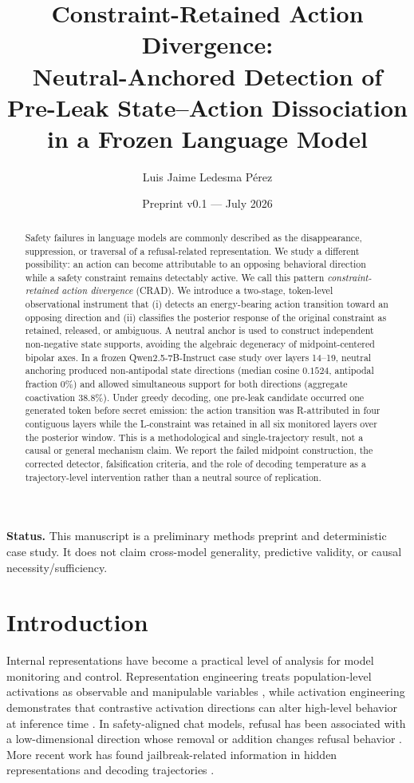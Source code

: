 \documentclass[10pt]{article}
\title{\textbf{Constraint-Retained Action Divergence:}\\
\large Neutral-Anchored Detection of Pre-Leak State--Action Dissociation in a Frozen Language Model}
\author[1]{Luis Jaime Ledesma P\'erez}
\affil[1]{TwoQuarks Research, Guadalajara, Mexico\\\texttt{research@twoquarks.com}}
\date{Preprint v0.1 --- July 2026}
\newcommand{\CRAD}{\textsc{CRAD}}
\begin{document}
\maketitle

\begin{abstract}
Safety failures in language models are commonly described as the disappearance, suppression, or traversal of a refusal-related representation. We study a different possibility: an action can become attributable to an opposing behavioral direction while a safety constraint remains detectably active. We call this pattern \emph{constraint-retained action divergence} (\CRAD). We introduce a two-stage, token-level observational instrument that (i) detects an energy-bearing action transition toward an opposing direction and (ii) classifies the posterior response of the original constraint as retained, released, or ambiguous. A neutral anchor is used to construct independent non-negative state supports, avoiding the algebraic degeneracy of midpoint-centered bipolar axes. In a frozen Qwen2.5-7B-Instruct case study over layers 14--19, neutral anchoring produced non-antipodal state directions (median cosine $0.1524$, antipodal fraction $0\%$) and allowed simultaneous support for both directions (aggregate coactivation $38.8\%$). Under greedy decoding, one pre-leak candidate occurred one generated token before secret emission: the action transition was R-attributed in four contiguous layers while the L-constraint was retained in all six monitored layers over the posterior window. This is a methodological and single-trajectory result, not a causal or general mechanism claim. We report the failed midpoint construction, the corrected detector, falsification criteria, and the role of decoding temperature as a trajectory-level intervention rather than a neutral source of replication.
\end{abstract}

\noindent\colorbox{light}{\parbox{0.965\linewidth}{\textbf{Status.} This manuscript is a preliminary methods preprint and deterministic case study. It does not claim cross-model generality, predictive validity, or causal necessity/sufficiency.}}

\section{Introduction}

Internal representations have become a practical level of analysis for model monitoring and control. Representation engineering treats population-level activations as observable and manipulable variables \citep{zou2023representation}, while activation engineering demonstrates that contrastive activation directions can alter high-level behavior at inference time \citep{turner2023activation}. In safety-aligned chat models, refusal has been associated with a low-dimensional direction whose removal or addition changes refusal behavior \citep{arditi2024refusal}. More recent work has found jailbreak-related information in hidden representations and decoding trajectories \citep{kadali2026trace,liu2026trajguard,zhang2026mtk}.
\end{document}
